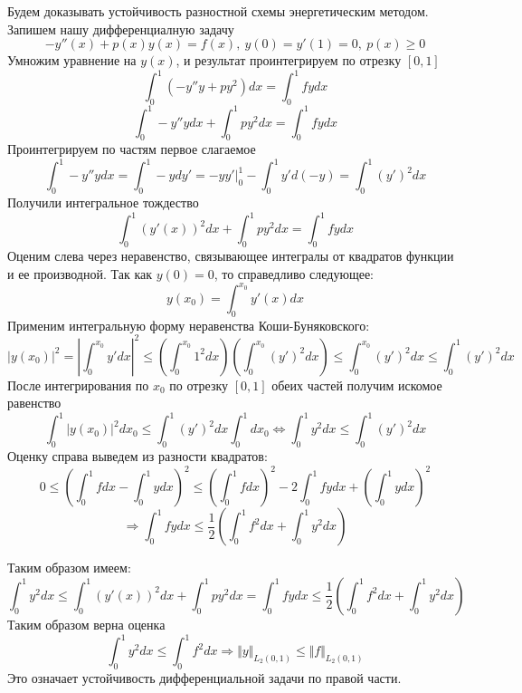 \documentclass[12pt]{article}
\begin{document}
\begin{enumerate}[I.]
        Будем доказывать устойчивость разностной схемы энергетическим методом.
        Запишем нашу дифференциалную задачу
        \[-y''(x)+p(x)y(x)=f(x),\ y(0) = y'(1) = 0,\ p(x)\geq 0\]
        Умножим уравнение на $y(x)$, и результат проинтегрируем по отрезку $[0, 1]$
        \[\int_0^1 (-y''y+py^2)dx = \int_0^1fydx \]
        \[\int_0^1 -y''ydx+ \int_0^1py^2 dx = \int_0^1fydx \]
        Проинтегрируем по частям первое слагаемое
        \[\int_0^1 -y''ydx = \int_0^1-ydy' = -yy'\vert^1_0 - \int_0^1y'd(-y) = \int_0^1(y')^2dx\]
        Получили интегральное тождество
        \[\int_0^1 (y'(x))^2dx+ \int_0^1py^2 dx = \int_0^1fydx \]
        Оценим слева через неравенство, связывающее интегралы от квадратов
        функции и ее производной. Так как $y(0) = 0$, то справедливо следующее:
        \[y(x_0) = \int_0^{x_0}y'(x)dx\]
        Применим интегральную форму неравенства Коши-Буняковского:
        \[|y(x_0)|^2 = \left|\int_0^{x_0}y'dx\right|^2\leq\left(\int_0^{x_0}1^2dx\right)\left(\int_0^{x_0}(y')^2dx\right)\leq\int_0^{x_0}(y')^2dx\leq\int_0^{1}(y')^2dx\]
        После интегрирования по $x_0$ по отрезку $[0,1]$ обеих частей получим искомое равенство
        \[\int_0^1|y(x_0)|^2dx_0 \leq \int_0^{1}(y')^2dx\int_0^1dx_0 \Leftrightarrow \int_0^1y^2dx\leq\int_0^1(y')^2dx\]
        Оценку справа выведем из разности квадратов:
        \[0\leq\left(\int_0^1fdx-\int_0^1ydx\right)^2\leq\left(\int_0^1fdx\right)^2-2\int_0^1fydx+\left(\int_0^1ydx\right)^2\]
        \[\Rightarrow\int_0^1fydx\leq\frac{1}{2}\left(\int_0^1f^2dx + \int_0^1y^2dx\right)\]

        Таким образом имеем:
        \[\int_0^1y^2dx\leq\int_0^1 (y'(x))^2dx+ \int_0^1py^2 dx = \int_0^1fydx\leq\frac{1}{2}\left(\int_0^1f^2dx + \int_0^1y^2dx\right)\]
        Таким образом верна оценка
        \[\int_0^1y^2dx\leq\int_0^1f^2dx\Rightarrow\Vert y\Vert_{L_2(0,1)}\leq\Vert f\Vert_{L_2(0,1)}\]
        Это означает устойчивость дифференциальной задачи по правой части.


\end{enumerate}
\end{document}

